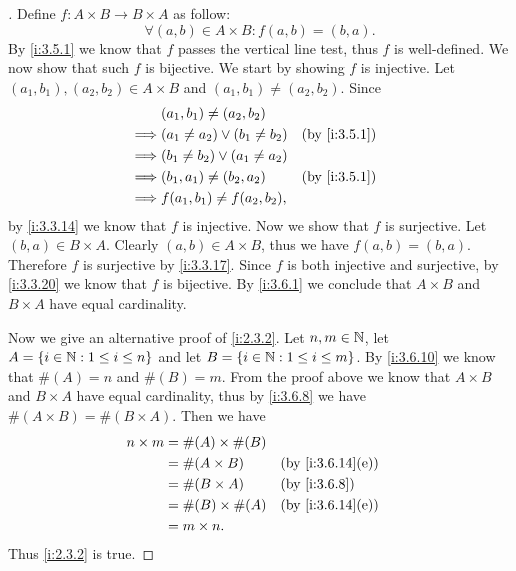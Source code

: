 \begin{proof}[]
  Define \(f : A \times B \to B \times A\) as follow:
  \[
    \forall (a, b) \in A \times B : f(a, b) = (b, a).
  \]
  By \cref{i:3.5.1} we know that \(f\) passes the vertical line test, thus \(f\) is well-defined.
  We now show that such \(f\) is bijective.
  We start by showing \(f\) is injective.
  Let \((a_1, b_1), (a_2, b_2) \in A \times B\) and \((a_1, b_1) \neq (a_2, b_2)\).
  Since
  \begin{align*}
             & (a_1, b_1) \neq (a_2, b_2)                           \\
    \implies & (a_1 \neq a_2) \lor (b_1 \neq b_2) &  & \by{i:3.5.1} \\
    \implies & (b_1 \neq b_2) \lor (a_1 \neq a_2)                   \\
    \implies & (b_1, a_1) \neq (b_2, a_2)         &  & \by{i:3.5.1} \\
    \implies & f(a_1, b_1) \neq f(a_2, b_2),
  \end{align*}
  by \cref{i:3.3.14} we know that \(f\) is injective.
  Now we show that \(f\) is surjective.
  Let \((b, a) \in B \times A\).
  Clearly \((a, b) \in A \times B\), thus we have \(f(a, b) = (b, a)\).
  Therefore \(f\) is surjective by \cref{i:3.3.17}.
  Since \(f\) is both injective and surjective, by \cref{i:3.3.20} we know that \(f\) is bijective.
  By \cref{i:3.6.1} we conclude that \(A \times B\) and \(B \times A\) have equal cardinality.

  Now we give an alternative proof of \cref{i:2.3.2}.
  Let \(n, m \in \mathbb{N}\), let \(A = \left\lbrace i \in \mathbb{N} : 1 \leq i \leq n\right\rbrace\) and let \(B = \left\lbrace i \in \mathbb{N} : 1 \leq i \leq m\right\rbrace\).
  By \cref{i:3.6.10} we know that \(\#(A) = n\) and \(\#(B) = m\).
  From the proof above we know that \(A \times B\) and \(B \times A\) have equal cardinality, thus by \cref{i:3.6.8} we have \(\#(A \times B) = \#(B \times A)\).
  Then we have
  \begin{align*}
    n \times m & = \#(A) \times \#(B)                       \\
               & = \#(A \times B)     &  & \by{i:3.6.14}[e] \\
               & = \#(B \times A)     &  & \by{i:3.6.8}     \\
               & = \#(B) \times \#(A) &  & \by{i:3.6.14}[e] \\
               & = m \times n.
  \end{align*}
  Thus \cref{i:2.3.2} is true.
\end{proof}

